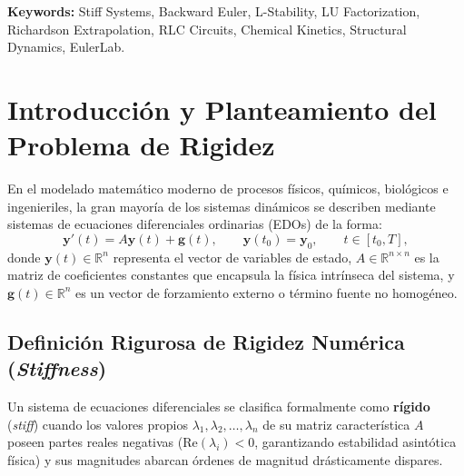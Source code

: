 \documentclass[11pt,a4paper]{article}
\begin{document}
\vspace{0.8cm}
\noindent\textbf{Keywords:} Stiff Systems, Backward Euler, L-Stability, LU Factorization, Richardson Extrapolation, RLC Circuits, Chemical Kinetics, Structural Dynamics, EulerLab.

\newpage
\tableofcontents
\newpage
\listoffigures
\vspace{0.8cm}
\listoftables

\newpage
{}
\section{Introducción y Planteamiento del Problema de Rigidez}

En el modelado matemático moderno de procesos físicos, químicos, biológicos e ingenieriles, la gran mayoría de los sistemas dinámicos se describen mediante sistemas de ecuaciones diferenciales ordinarias (EDOs) de la forma:
\begin{equation}
    \mathbf{y}'(t) = A\mathbf{y}(t) + \mathbf{g}(t), \qquad \mathbf{y}(t_0) = \mathbf{y}_0, \qquad t \in [t_0, T],
    \label{eq:sistema_lineal}
\end{equation}
donde $\mathbf{y}(t) \in \mathbb{R}^n$ representa el vector de variables de estado, $A \in \mathbb{R}^{n \times n}$ es la matriz de coeficientes constantes que encapsula la física intrínseca del sistema, y $\mathbf{g}(t) \in \mathbb{R}^n$ es un vector de forzamiento externo o término fuente no homogéneo.

\subsection{Definición Rigurosa de Rigidez Numérica (\textit{Stiffness})}
Un sistema de ecuaciones diferenciales se clasifica formalmente como \textbf{rígido} (\textit{stiff}) cuando los valores propios $\lambda_1, \lambda_2, \dots, \lambda_n$ de su matriz característica $A$ poseen partes reales negativas ($\text{Re}(\lambda_i) < 0$, garantizando estabilidad asintótica física) y sus magnitudes abarcan órdenes de magnitud drásticamente dispares.
\end{document}
